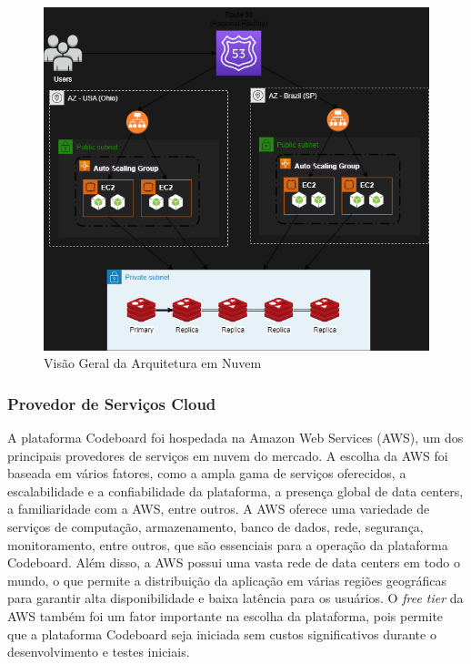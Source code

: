\begin{figure}[H]
    \centering
    \includegraphics[width=\textwidth]{drawio/cloud-architecture.png}
    \caption{Visão Geral da Arquitetura em Nuvem}
    \label{fig:cloud-architecture}
\end{figure}


\subsubsection{Provedor de Serviços Cloud}

A plataforma Codeboard foi hospedada na Amazon Web Services (AWS), um dos principais provedores de serviços em nuvem do mercado. A escolha da AWS foi baseada em vários fatores, como a ampla gama de serviços oferecidos, a escalabilidade e a confiabilidade da plataforma, a presença global de data centers, a familiaridade com a AWS, entre outros. A AWS oferece uma variedade de serviços de computação, armazenamento, banco de dados, rede, segurança, monitoramento, entre outros, que são essenciais para a operação da plataforma Codeboard. Além disso, a AWS possui uma vasta rede de data centers em todo o mundo, o que permite a distribuição da aplicação em várias regiões geográficas para garantir alta disponibilidade e baixa latência para os usuários. O \emph{free tier} da AWS também foi um fator importante na escolha da plataforma, pois permite que a plataforma Codeboard seja iniciada sem custos significativos durante o desenvolvimento e testes iniciais.


